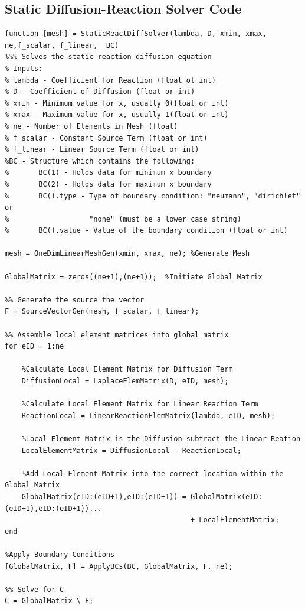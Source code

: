 \documentclass[11pt]{article}
\begin{document}
\begin{appendices}
\section{Static Diffusion-Reaction Solver Code}
\label{ap:SDRS}
\begin{lstlisting}
function [mesh] = StaticReactDiffSolver(lambda, D, xmin, xmax, ne,f_scalar, f_linear,  BC)
%%% Solves the static reaction diffusion equation
% Inputs:
% lambda - Coefficient for Reaction (float ot int)
% D - Coefficient of Diffusion (float or int)
% xmin - Minimum value for x, usually 0(float or int)
% xmax - Maximum value for x, usually 1(float or int)
% ne - Number of Elements in Mesh (float)
% f_scalar - Constant Source Term (float or int)
% f_linear - Linear Source Term (float or int)
%BC - Structure which contains the following:
%       BC(1) - Holds data for minimum x boundary
%       BC(2) - Holds data for maximum x boundary
%       BC().type - Type of boundary condition: "neumann", "dirichlet" or
%                   "none" (must be a lower case string)
%       BC().value - Value of the boundary condition (float or int)

mesh = OneDimLinearMeshGen(xmin, xmax, ne); %Generate Mesh

GlobalMatrix = zeros((ne+1),(ne+1));  %Initiate Global Matrix

%% Generate the source the vector
F = SourceVectorGen(mesh, f_scalar, f_linear);

%% Assemble local element matrices into global matrix
for eID = 1:ne
    
    %Calculate Local Element Matrix for Diffusion Term
    DiffusionLocal = LaplaceElemMatrix(D, eID, mesh);
    
    %Calculate Local Element Matrix for Linear Reaction Term
    ReactionLocal = LinearReactionElemMatrix(lambda, eID, mesh);
    
    %Local Element Matrix is the Diffusion subtract the Linear Reation
    LocalElementMatrix = DiffusionLocal - ReactionLocal;
                        
    %Add Local Element Matrix into the correct location within the Global Matrix
    GlobalMatrix(eID:(eID+1),eID:(eID+1)) = GlobalMatrix(eID:(eID+1),eID:(eID+1))...
                                            + LocalElementMatrix;
end

%Apply Boundary Conditions
[GlobalMatrix, F] = ApplyBCs(BC, GlobalMatrix, F, ne);

%% Solve for C
C = GlobalMatrix \ F;


\end{lstlisting}
\end{appendices}
\end{document}
